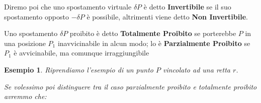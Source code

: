 \documentclass[11pt,a4paper,twoside]{article}
\newtheorem{es}{Esempio}
\theoremstyle{definition}
\begin{document}
Diremo poi che uno spostamento virtuale $\delta P$ è detto \textbf{Invertibile} se il suo spostamento opposto $-\delta P$ è possibile, altrimenti viene detto \textbf{Non Invertibile}.

Uno spostamento $\delta P$ proibito è detto \textbf{Totalmente Proibito} se porterebbe $P$ in una posizione $P_1$ inavvicinabile in alcun modo; lo è \textbf{Parzialmente Proibito} se $P_1$ è avvicinabile, ma comunque irraggiungibile

\begin{es}
	Riprendiamo l'esempio di un punto $P$ vincolato ad una retta $r$.
	\begin{center}
	\end{center}
	Se volessimo poi distinguere tra il caso parzialmente proibito e totalmente proibito avremmo che:
	\begin{center}
	\end{center}
\end{es}
\end{document}
